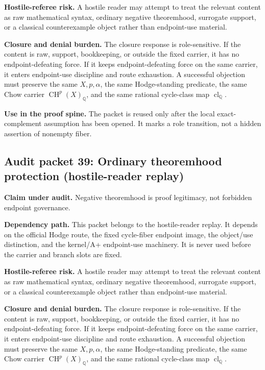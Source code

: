 \documentclass[11pt]{article}
\newcommand{\QQ}{\mathbb{Q}}
\newcommand{\CH}{\operatorname{CH}}
\newcommand{\clQ}{\operatorname{cl}_{\QQ}}
\begin{document}
\par\noindent\textbf{Hostile-referee risk.} A hostile reader may attempt to treat the relevant content as raw mathematical syntax, ordinary negative theoremhood, surrogate support, or a classical counterexample object rather than endpoint-use material.


\par\noindent\textbf{Closure and denial burden.} The closure response is role-sensitive. If the content is raw, support, bookkeeping, or outside the fixed carrier, it has no endpoint-defeating force. If it keeps endpoint-defeating force on the same carrier, it enters endpoint-use discipline and route exhaustion. A successful objection must preserve the same $X,p,\alpha$, the same Hodge-standing predicate, the same Chow carrier $\CH^p(X)_\QQ$, and the same rational cycle-class map $\clQ$.


\par\noindent\textbf{Use in the proof spine.} The packet is reused only after the local exact-complement assumption has been opened. It marks a role transition, not a hidden assertion of nonempty fiber.


\subsection{Audit packet 39: Ordinary theoremhood protection (hostile-reader replay)}


\par\noindent\textbf{Claim under audit.} Negative theoremhood is proof legitimacy, not forbidden endpoint governance.


\par\noindent\textbf{Dependency path.} This packet belongs to the hostile-reader replay. It depends on the official Hodge route, the fixed cycle-fiber endpoint image, the object/use distinction, and the kernel/A+ endpoint-use machinery. It is never used before the carrier and branch slots are fixed.


\par\noindent\textbf{Hostile-referee risk.} A hostile reader may attempt to treat the relevant content as raw mathematical syntax, ordinary negative theoremhood, surrogate support, or a classical counterexample object rather than endpoint-use material.


\par\noindent\textbf{Closure and denial burden.} The closure response is role-sensitive. If the content is raw, support, bookkeeping, or outside the fixed carrier, it has no endpoint-defeating force. If it keeps endpoint-defeating force on the same carrier, it enters endpoint-use discipline and route exhaustion. A successful objection must preserve the same $X,p,\alpha$, the same Hodge-standing predicate, the same Chow carrier $\CH^p(X)_\QQ$, and the same rational cycle-class map $\clQ$.
\end{document}
